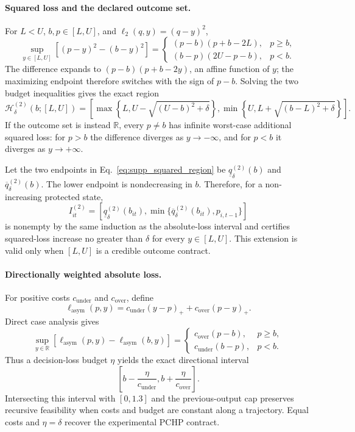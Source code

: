 \documentclass[11pt]{article}
\begin{document}
\paragraph{Squared loss and the declared outcome set.}
For \(L<U\), \(b,p\in[L,U]\), and \(\ell_2(q,y)=(q-y)^2\),
\begin{equation}
 \sup_{y\in[L,U]}[(p-y)^2-(b-y)^2]
 =
 \begin{cases}
 (p-b)(p+b-2L), & p\geq b,\\
 (b-p)(2U-p-b), & p<b.
 \end{cases}
 \label{eq:supp_squared_identity}
\end{equation}
The difference expands to \((p-b)(p+b-2y)\), an affine function of \(y\); the maximizing endpoint therefore switches with the sign of \(p-b\). Solving the two budget inequalities gives the exact region
\begin{equation}
 \mathcal H^{(2)}_\delta(b;[L,U])
 =
 \left[
 \max\!\left\{L,U-\sqrt{(U-b)^2+\delta}\right\},
 \min\!\left\{U,L+\sqrt{(b-L)^2+\delta}\right\}
 \right].
 \label{eq:supp_squared_region}
\end{equation}
If the outcome set is instead \(\mathbb R\), every \(p\neq b\) has infinite worst-case additional squared loss: for \(p>b\) the difference diverges as \(y\to-\infty\), and for \(p<b\) it diverges as \(y\to+\infty\).

Let the two endpoints in Eq.~\eqref{eq:supp_squared_region} be \(\underline q^{(2)}_\delta(b)\) and \(\overline q^{(2)}_\delta(b)\). The lower endpoint is nondecreasing in \(b\). Therefore, for a non-increasing protected state,
\[
 I^{(2)}_{it}=
 [\underline q^{(2)}_\delta(b_{it}),
 \min\{\overline q^{(2)}_\delta(b_{it}),p_{i,t-1}\}]
\]
is nonempty by the same induction as the absolute-loss interval and certifies squared-loss increase no greater than \(\delta\) for every \(y\in[L,U]\). This extension is valid only when \([L,U]\) is a credible outcome contract.

\paragraph{Directionally weighted absolute loss.}
For positive costs \(c_{\mathrm{under}}\) and \(c_{\mathrm{over}}\), define
\[
 \ell_{\mathrm{asym}}(p,y)
 =c_{\mathrm{under}}(y-p)_+
 +c_{\mathrm{over}}(p-y)_+.
\]
Direct case analysis gives
\begin{equation}
 \sup_{y\in\mathbb R}
 [\ell_{\mathrm{asym}}(p,y)-\ell_{\mathrm{asym}}(b,y)]
 =
 \begin{cases}
 c_{\mathrm{over}}(p-b), & p\geq b,\\
 c_{\mathrm{under}}(b-p), & p<b.
 \end{cases}
 \label{eq:supp_asymmetric_identity}
\end{equation}
Thus a decision-loss budget \(\eta\) yields the exact directional interval
\[
 \left[b-\frac{\eta}{c_{\mathrm{under}}},
 b+\frac{\eta}{c_{\mathrm{over}}}\right].
\]
Intersecting this interval with \([0,1.3]\) and the previous-output cap preserves recursive feasibility when costs and budget are constant along a trajectory. Equal costs and \(\eta=\delta\) recover the experimental PCHP contract.
\end{document}
